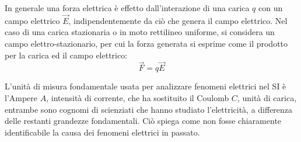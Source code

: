 \documentclass{article}
\numberwithin{equation}{subsection}
\begin{document}
In generale una forza elettrica è effetto dall'interazione di una carica $q$ con un campo elettrico $\vec{E}$, indipendentemente da ciò che genera il campo elettrico. Nel 
caso di una carica stazionaria o in moto rettilineo uniforme, si considera un campo elettro-stazionario, per cui la forza generata si esprime come il prodotto per la carica 
ed il campo elettrico: 
\begin{equation}
    \vec{F}=q\vec{E}
\end{equation}

L'unità di misura fondamentale usata per analizzare fenomeni elettrici nel SI è l'Ampere $A$, intensità di corrente, che ha sostituito il Coulomb $C$, unità di carica, 
entrambe sono cognomi di scienziati che hanno studiato l'elettricità, a differenza delle restanti grandezze fondamentali. Ciò spiega come non fosse chiaramente 
identificabile la causa dei fenomeni elettrici in passato. 
\end{document}

